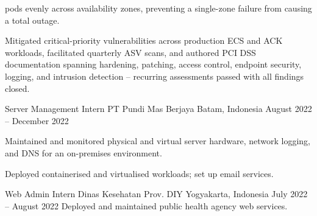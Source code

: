 \begin{cventries}
{\begin{cvitems}
{          pods evenly across availability zones, preventing a single-zone failure
          from causing a total outage.}
        \item {Mitigated critical-priority vulnerabilities across production ECS and
          ACK workloads, facilitated quarterly ASV scans, and authored PCI DSS
          documentation spanning hardening, patching, access control, endpoint
          security, logging, and intrusion detection -- recurring assessments
          passed with all findings closed.}
      \end{cvitems}
    }
    \linebreak

  \cventry
    {Server Management Intern} %
    {PT Pundi Mas Berjaya} %
    {Batam, Indonesia} %
    {August 2022 -- December 2022} %
    {
      \begin{cvitems} %
        \item {Maintained and monitored physical and virtual server hardware,
          network logging, and DNS for an on-premises environment.}
        \item {Deployed containerised and virtualised workloads; set up email
          services.}
      \end{cvitems}
    }

  \cventry
    {Web Admin Intern}
    {Dinas Kesehatan Prov. DIY}
    {Yogyakarta, Indonesia}
    {July 2022 -- August 2022}
    {
      Deployed and maintained public health agency web services.
    }

\end{cventries}
\vspace{2.0mm}
